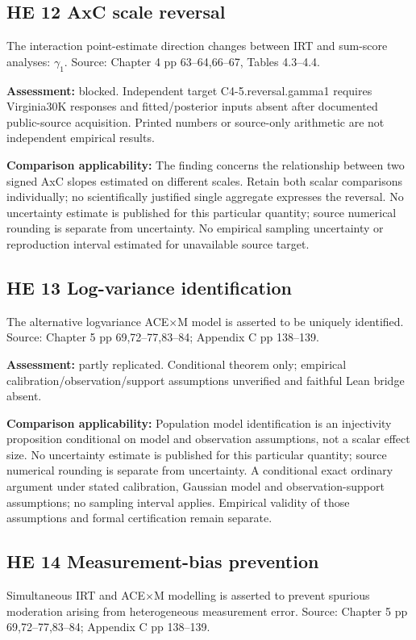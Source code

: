 \documentclass[11pt]{article}
\begin{document}
\subsection{HE 12 AxC scale reversal}\label{head:HE12}
The interaction point-estimate direction changes between IRT and sum-score analyses: $\gamma_1$. Source: Chapter 4 pp 63--64,66--67, Tables 4.3--4.4.

\textbf{Assessment:} blocked. Independent target C4-5.reversal.gamma1 requires Virginia30K responses and fitted/posterior inputs absent after documented public-source acquisition. Printed numbers or source-only arithmetic are not independent empirical results.

\textbf{Comparison applicability:} The finding concerns the relationship between two signed AxC slopes estimated on different scales. Retain both scalar comparisons individually; no scientifically justified single aggregate expresses the reversal. No uncertainty estimate is published for this particular quantity; source numerical rounding is separate from uncertainty. No empirical sampling uncertainty or reproduction interval estimated for unavailable source target.
\subsection{HE 13 Log-variance identification}\label{head:HE13}
The alternative logvariance ACE$\times$M model is asserted to be uniquely identified. Source: Chapter 5 pp 69,72--77,83--84; Appendix C pp 138--139.

\textbf{Assessment:} partly replicated. Conditional theorem only; empirical calibration/observation/support assumptions unverified and faithful Lean bridge absent.

\textbf{Comparison applicability:} Population model identification is an injectivity proposition conditional on model and observation assumptions, not a scalar effect size. No uncertainty estimate is published for this particular quantity; source numerical rounding is separate from uncertainty. A conditional exact ordinary argument under stated calibration, Gaussian model and observation-support assumptions; no sampling interval applies. Empirical validity of those assumptions and formal certification remain separate.
\subsection{HE 14 Measurement-bias prevention}\label{head:HE14}
Simultaneous IRT and ACE$\times$M modelling is asserted to prevent spurious moderation arising from heterogeneous measurement error. Source: Chapter 5 pp 69,72--77,83--84; Appendix C pp 138--139.
\end{document}
